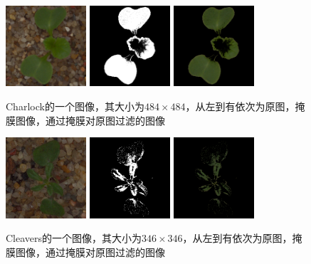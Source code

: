 \begin{figure}[htbp]
\centering
\includegraphics[width=30mm,height=30mm]{../figures/Charlock_0a7e1ca41.png} 
\includegraphics[width=30mm,height=30mm]{../figures/Charlock_0a7e1ca41_mask.png} 	
\includegraphics[width=30mm,height=30mm]{../figures/Charlock_0a7e1ca41_res.png} 	
\caption{Charlock的一个图像，其大小为$484\times 484$，从左到有依次为原图，掩膜图像，通过掩膜对原图过滤的图像}
\label{fig:ch1} 
\end{figure}

\begin{figure}[htbp]
\centering
\includegraphics[width=30mm,height=30mm]{../figures/Cleavers_0a1e622bc.png} 
\includegraphics[width=30mm,height=30mm]{../figures/Cleavers_0a1e622bc_mask.png} 	
\includegraphics[width=30mm,height=30mm]{../figures/Cleavers_0a1e622bc_res.png} 
\caption{Cleavers的一个图像，其大小为$346\times 346$，从左到有依次为原图，掩膜图像，通过掩膜对原图过滤的图像}
\label{fig:cl} 
\end{figure}



